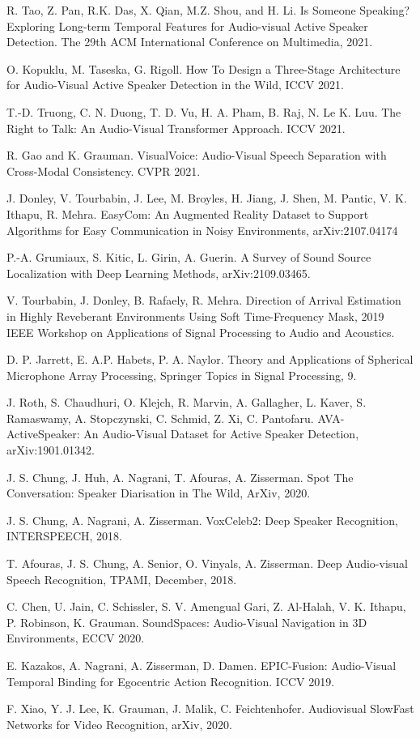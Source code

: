 \documentclass[10pt,twocolumn,letterpaper]{article}
\begin{document}
\begin{thebibliography}{9}
 R. Tao, Z. Pan, R.K. Das, X. Qian, M.Z. Shou, and H. Li. Is Someone Speaking? Exploring Long-term Temporal Features for Audio-visual Active Speaker Detection. The 29th ACM International Conference on Multimedia, 2021.

 O. Kopuklu, M. Taseska, G. Rigoll.   	
How To Design a Three-Stage Architecture for Audio-Visual Active Speaker Detection in the Wild,
ICCV 2021.

 T.-D. Truong,
C. N. Duong,
T. D. Vu,
H. A. Pham,
B. Raj,
N. Le
K. Luu.
The Right to Talk:
An Audio-Visual Transformer Approach. ICCV 2021.

 R. Gao and K. Grauman. VisualVoice: Audio-Visual Speech Separation with Cross-Modal Consistency. 
	CVPR 2021.

 J. Donley, V. Tourbabin, J. Lee, M. Broyles, H. Jiang, J. Shen, M. Pantic, V. K. Ithapu, R. Mehra.
EasyCom: An Augmented Reality Dataset to Support Algorithms for Easy Communication in Noisy Environments,
	arXiv:2107.04174
	
 P.-A. Grumiaux, S. Kitic, L. Girin, A. Guerin.	
A Survey of Sound Source Localization with Deep Learning Methods,
arXiv:2109.03465.

 V. Tourbabin, J. Donley, B. Rafaely, R. Mehra. Direction of Arrival Estimation in Highly Reveberant Environments
Using Soft Time-Frequency Mask, 2019 IEEE Workshop on Applications of Signal Processing to Audio and Acoustics.

 D. P. Jarrett, E. A.P. Habets, P. A. Naylor. Theory and Applications of Spherical Microphone Array Processing,
Springer Topics in Signal Processing, 9.

 J. Roth, S. Chaudhuri, O. Klejch, R. Marvin, A. Gallagher, L. Kaver, S. Ramaswamy, A. Stopczynski, C. Schmid, Z. Xi, C. Pantofaru. 
	AVA-ActiveSpeaker: An Audio-Visual Dataset for Active Speaker Detection, arXiv:1901.01342.

 J. S. Chung, J. Huh, A. Nagrani, T. Afouras, A. Zisserman. Spot The Conversation: Speaker Diarisation in The Wild, ArXiv, 2020.	

 J. S. Chung, A. Nagrani, A. Zisserman. VoxCeleb2: Deep Speaker Recognition, INTERSPEECH, 2018.

 T. Afouras, 
J. S. Chung, 
A. Senior, 
O. Vinyals, 
A. Zisserman. 
Deep Audio-visual Speech Recognition,
TPAMI, December, 2018.

 C. Chen, U. Jain, C. Schissler, S. V. Amengual Gari, 
Z. Al-Halah, V. K. Ithapu, P. Robinson, K. Grauman.
SoundSpaces: Audio-Visual Navigation in 3D Environments,
ECCV 2020.

 E. Kazakos, A. Nagrani, A. Zisserman, D. Damen. 
	EPIC-Fusion: Audio-Visual Temporal Binding for Egocentric Action Recognition.
	ICCV 2019.

 F. Xiao, Y. J. Lee, K. Grauman, J. Malik, C. Feichtenhofer.
	Audiovisual SlowFast Networks for Video Recognition, arXiv, 2020.
	
\end{thebibliography}
\end{document}
